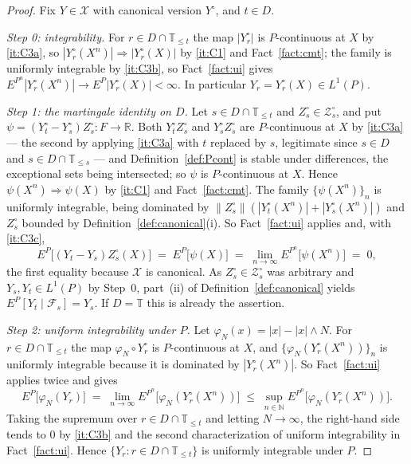 \documentclass[11pt,a4paper]{article}
\theoremstyle{plain}
\theoremstyle{definition}
\theoremstyle{remark}
\newcommand{\R}{\mathbb{R}}
\newcommand{\N}{\mathbb{N}}
\newcommand{\T}{\mathbb{T}}                     %
\newcommand{\Filt}{\mathcal{F}}
\newcommand{\XX}{\mathcal{X}}                  %
\newcommand{\ZZ}{\mathcal{Z}}                  %
\DeclareMathOperator*{\wto}{\Rightarrow}
\begin{document}
\begin{proof}
  Fix $Y \in \XX$ with canonical version $Y^\circ$, and $t \in D$.

  \emph{Step 0: integrability.}  For $r \in D \cap \T_{\leq t}$ the map
  $|Y^\circ_r|$ is $P$-continuous at $X$ by \ref{it:C3a}, so
  $|Y^\circ_r(X^n)| \wto |Y^\circ_r(X)|$ by \ref{it:C1} and
  Fact~\ref{fact:cmt}; the family is uniformly integrable by \ref{it:C3b}, so
  Fact~\ref{fact:ui} gives
  $E^{P^n}|Y^\circ_r(X^n)| \to E^P|Y^\circ_r(X)| < \infty$.  In particular
  $Y_r = Y^\circ_r(X) \in L^1(P)$.

  \emph{Step 1: the martingale identity on $D$.}
  Let $s \in D \cap \T_{\leq t}$ and $Z^\circ_s \in \ZZ^\circ_s$, and put
  $\psi = (Y^\circ_t - Y^\circ_s) Z^\circ_s : F \to \R$.  Both $Y^\circ_t Z^\circ_s$
  and $Y^\circ_s Z^\circ_s$ are $P$-continuous at $X$ by \ref{it:C3a} --- the
  second by applying \ref{it:C3a} with $t$ replaced by $s$, legitimate since
  $s \in D$ and $s \in D \cap \T_{\leq s}$ --- and
  Definition~\ref{def:Pcont} is stable under differences, the exceptional sets
  being intersected; so $\psi$ is $P$-continuous at $X$.
  Hence $\psi(X^n) \wto \psi(X)$ by \ref{it:C1} and Fact~\ref{fact:cmt}.  The
  family $\{\psi(X^n)\}_n$ is uniformly integrable, being dominated by
  $\lVert Z^\circ_s \rVert ( |Y^\circ_t(X^n)| + |Y^\circ_s(X^n)| )$ and
  $Z^\circ_s$ bounded by Definition~\ref{def:canonical}(i).  So
  Fact~\ref{fact:ui} applies and, with \ref{it:C3c},
  \[
    E^P\bigl[ (Y_t - Y_s) Z^\circ_s(X) \bigr]
      \;=\; E^P\bigl[ \psi(X) \bigr]
      \;=\; \lim_{n \to \infty} E^{P^n}\bigl[ \psi(X^n) \bigr]
      \;=\; 0 ,
  \]
  the first equality because $\XX$ is canonical.  As $Z^\circ_s \in \ZZ^\circ_s$
  was arbitrary and $Y_s, Y_t \in L^1(P)$ by Step~0, part~(ii) of
  Definition~\ref{def:canonical} yields $E^P[Y_t \mid \Filt_s] = Y_s$.  If
  $D = \T$ this is already the assertion.

  \emph{Step 2: uniform integrability under $P$.}
  Let $\varphi_N(x) = |x| - |x| \wedge N$.  For $r \in D \cap \T_{\leq t}$ the map
  $\varphi_N \circ Y^\circ_r$ is $P$-continuous at $X$, and
  $\{\varphi_N(Y^\circ_r(X^n))\}_n$ is uniformly integrable because it is
  dominated by $|Y^\circ_r(X^n)|$.  So Fact~\ref{fact:ui} applies twice and gives
  \[
    E^P\bigl[ \varphi_N(Y_r) \bigr]
      \;=\; \lim_{n \to \infty} E^{P^n}\bigl[ \varphi_N(Y^\circ_r(X^n)) \bigr]
      \;\leq\; \sup_{n \in \N} E^{P^n}\bigl[ \varphi_N(Y^\circ_r(X^n)) \bigr] .
  \]
  Taking the supremum over $r \in D \cap \T_{\leq t}$ and letting $N \to \infty$,
  the right-hand side tends to $0$ by \ref{it:C3b} and the second
  characterization of uniform integrability in Fact~\ref{fact:ui}.  Hence
  $\{ Y_r : r \in D \cap \T_{\leq t} \}$ is uniformly integrable under $P$.


\end{proof}
\end{document}
